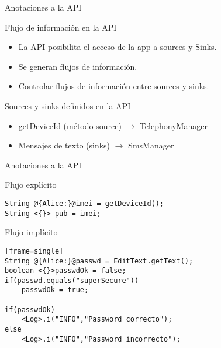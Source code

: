 \begin{frame}{Anotaciones a la API} 
\begin{block}{Flujo de información en la API}
	\begin{itemize}
	  \item La API posibilita el acceso de la app a sources y Sinks.
	  \item Se generan flujos de información.
	  \item Controlar flujos de información entre sources y sinks.
	\end{itemize}
\end{block}
\pause
\begin{block}{Sources y sinks definidos en la API}
	\begin{itemize}
	  \item getDeviceId (método source) $\rightarrow$ TelephonyManager
	  \item Mensajes de texto (sinks) $\rightarrow$ SmsManager
	\end{itemize}
\end{block}
\end{frame}

\begin{frame}[fragile]{Anotaciones a la API}
\begin{block}{Flujo explícito}
\begin{center}
\begin{lstlisting}[style=base2]
String @{Alice:}@imei = getDeviceId();
String <{}> pub = imei;
\end{lstlisting}
\end{center}
\end{block}
\pause
\begin{block}{Flujo implícito}
\begin{center}
\begin{lstlisting}[style=base2][frame=single]
String @{Alice:}@passwd = EditText.getText();
boolean <{}>passwdOk = false;
if(passwd.equals("superSecure"))
	passwdOk = true;
	
if(passwdOk)
	<Log>.i("INFO","Password correcto");
else
	<Log>.i("INFO","Password incorrecto");
\end{lstlisting}
\end{center}
\end{block}
\end{frame}
